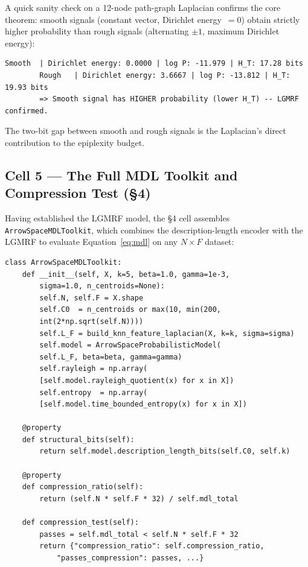 \documentclass[12pt,a4paper]{article}
\theoremstyle{plain}
\theoremstyle{definition}
\theoremstyle{remark}
\newcommand{\1}{\mathbf{1}}
\begin{document}
	A quick sanity check on a 12-node path-graph Laplacian confirms the
	core theorem: smooth signals (constant vector, Dirichlet energy~$= 0$)
	obtain strictly higher probability than rough signals (alternating
	$\pm 1$, maximum Dirichlet energy):
	
	\begin{lstlisting}[numbers=none, backgroundcolor=\color{white},
		frame=none]
		Smooth  | Dirichlet energy: 0.0000 | log P: -11.979 | H_T: 17.28 bits
		Rough   | Dirichlet energy: 3.6667 | log P: -13.812 | H_T: 19.93 bits
		=> Smooth signal has HIGHER probability (lower H_T) -- LGMRF confirmed.
	\end{lstlisting}
	
	\noindent The two-bit gap between smooth and rough signals is the
	Laplacian's direct contribution to the epiplexity budget.
	
	\subsection{Cell 5 --- The Full MDL Toolkit and Compression Test (§4)}
	
	Having established the LGMRF model, the §4 cell assembles
	\texttt{ArrowSpaceMDLToolkit}, which combines the description-length
	encoder with the LGMRF to evaluate Equation~\eqref{eq:mdl} on any
	$N\times F$ dataset:
	
	\begin{lstlisting}[caption={MDL toolkit: compression test over three synthetic datasets},
		label={lst:mdltoolkit}]
class ArrowSpaceMDLToolkit:
	def __init__(self, X, k=5, beta=1.0, gamma=1e-3,
		sigma=1.0, n_centroids=None):
		self.N, self.F = X.shape
		self.C0  = n_centroids or max(10, min(200,
		int(2*np.sqrt(self.N))))
		self.L_F = build_knn_feature_laplacian(X, k=k, sigma=sigma)
		self.model = ArrowSpaceProbabilisticModel(
		self.L_F, beta=beta, gamma=gamma)
		self.rayleigh = np.array(
		[self.model.rayleigh_quotient(x) for x in X])
		self.entropy  = np.array(
		[self.model.time_bounded_entropy(x) for x in X])
		
	@property
	def structural_bits(self):
		return self.model.description_length_bits(self.C0, self.k)
		
	@property
	def compression_ratio(self):
		return (self.N * self.F * 32) / self.mdl_total
		
	def compression_test(self):
		passes = self.mdl_total < self.N * self.F * 32
		return {"compression_ratio": self.compression_ratio,
			"passes_compression": passes, ...}
	\end{lstlisting}
	
\end{document}
